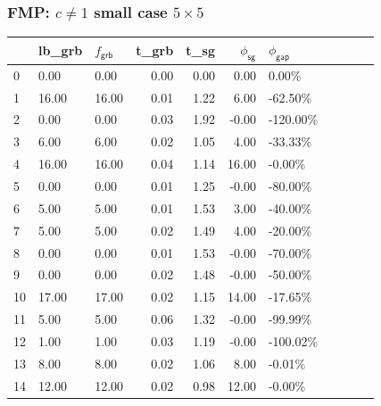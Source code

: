 \begin{frame}
  \frametitle{FMP: \(c \neq 1\) small case \(5 \times 5\)}
  \scriptsize
  \begin{tabular}{lllrrrlllll}
    \toprule
    {} & lb\_grb & \(f_{\textsf{grb}}\)   & t\_grb
       & t\_sg   & \(\phi_{\textsf{sg}}\) & \(\phi_{\textsf{gap}}\)                            \\
    \midrule
    0  & 0.00    & 0.00                   & 0.00                    & 0.00 & 0.00  & 0.00\%    \\
    1  & 16.00   & 16.00                  & 0.01                    & 1.22 & 6.00  & -62.50\%  \\
    2  & 0.00    & 0.00                   & 0.03                    & 1.92 & -0.00 & -120.00\% \\
    3  & 6.00    & 6.00                   & 0.02                    & 1.05 & 4.00  & -33.33\%  \\
    4  & 16.00   & 16.00                  & 0.04                    & 1.14 & 16.00 & -0.00\%   \\
    5  & 0.00    & 0.00                   & 0.01                    & 1.25 & -0.00 & -80.00\%  \\
    6  & 5.00    & 5.00                   & 0.01                    & 1.53 & 3.00  & -40.00\%  \\
    7  & 5.00    & 5.00                   & 0.02                    & 1.49 & 4.00  & -20.00\%  \\
    8  & 0.00    & 0.00                   & 0.01                    & 1.53 & -0.00 & -70.00\%  \\
    9  & 0.00    & 0.00                   & 0.02                    & 1.48 & -0.00 & -50.00\%  \\
    10 & 17.00   & 17.00                  & 0.02                    & 1.15 & 14.00 & -17.65\%  \\
    11 & 5.00    & 5.00                   & 0.06                    & 1.32 & -0.00 & -99.99\%  \\
    12 & 1.00    & 1.00                   & 0.03                    & 1.19 & -0.00 & -100.02\% \\
    13 & 8.00    & 8.00                   & 0.02                    & 1.06 & 8.00  & -0.01\%   \\
    14 & 12.00   & 12.00                  & 0.02                    & 0.98 & 12.00 & -0.00\%   \\

\end{tabular}
\end{frame}
